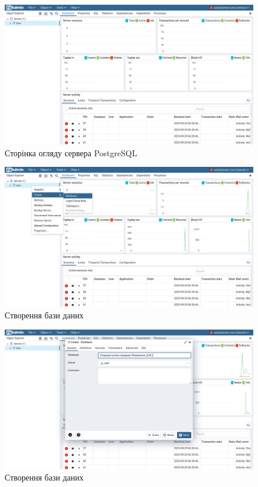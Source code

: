 \documentclass[14pt]{extreport}
\begin{document}
\begin{normalsize}
	\begin{figure}[H]
		\centering
		\includegraphics[scale=0.35]{3}
		\caption{Сторінка огляду сервера PostgreSQL}
	\end{figure}
	
	\begin{figure}[H]
		\centering
		\includegraphics[scale=0.35]{4}
		\caption{Створення бази даних}
	\end{figure}
	
	\begin{figure}[H]
		\centering
		\includegraphics[scale=0.35]{5}
		\caption{Створення бази даних}
	\end{figure}
	

\end{normalsize}
\end{document}
